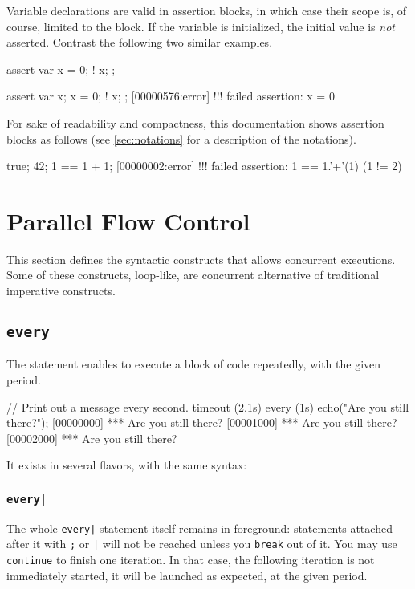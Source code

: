 Variable declarations are valid in assertion blocks, in which case their
scope is, of course, limited to the block.  If the variable is initialized,
the initial value is \emph{not} asserted.  Contrast the following two
similar examples.

\begin{urbiscript}
assert
{
  var x = 0;
  ! x;
};

assert
{
  var x;
  x = 0;
  ! x;
};
[00000576:error] !!! failed assertion: x = 0
\end{urbiscript}

For sake of readability and compactness, this documentation shows assertion
blocks as follows (see \autoref{sec:notations} for a description of the
notations).

\begin{urbiassert}
true;
42;
1 == 1 + 1;
[00000002:error] !!! failed assertion: 1 == 1.'+'(1) (1 != 2)
\end{urbiassert}


\section{Parallel Flow Control}

This section defines the syntactic constructs that allows concurrent
executions.  Some of these constructs, loop-like, are concurrent alternative
of traditional imperative constructs.

\subsection{\lstinline'every'}
\label{sec:lang:every}
The  statement enables to execute a block of code
repeatedly, with the given period.

\begin{urbiscript}
// Print out a message every second.
timeout (2.1s)
  every (1s)
    echo("Are you still there?");
[00000000] *** Are you still there?
[00001000] *** Are you still there?
[00002000] *** Are you still there?
\end{urbiscript}

It exists in several flavors, with the same syntax:


\subsubsection{\lstinline'every|'}
The whole \lstinline'every|' statement itself remains in foreground:
statements attached after it with \lstinline';' or \lstinline'|' will
not be reached unless you \lstinline'break' out of it.  You may use
\lstinline|continue| to finish one iteration.  In that case, the
following iteration is not immediately started, it will be launched as
expected, at the given period.

